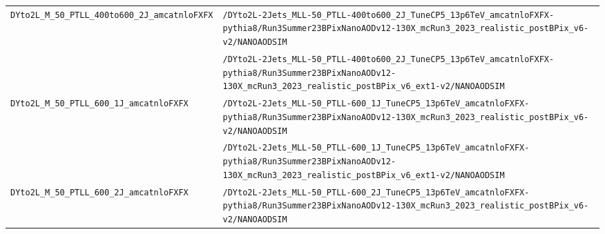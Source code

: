 \begin{longtable}{@{}>{\RaggedRight\arraybackslash}p{} >{\RaggedRight\arraybackslash}p{}@{}}
\addlinespace[2pt]
\texttt{DYto2L\_\allowbreak{}M\_\allowbreak{}50\_\allowbreak{}PTLL\_\allowbreak{}400to600\_\allowbreak{}2J\_\allowbreak{}amcatnloFXFX} & \texttt{/\allowbreak{}DYto2L-\allowbreak{}2Jets\_\allowbreak{}MLL-\allowbreak{}50\_\allowbreak{}PTLL-\allowbreak{}400to600\_\allowbreak{}2J\_\allowbreak{}TuneCP5\_\allowbreak{}13p6TeV\_\allowbreak{}amcatnloFXFX-\allowbreak{}pythia8/\allowbreak{}Run3Summer23BPixNanoAODv12-\allowbreak{}130X\_\allowbreak{}mcRun3\_\allowbreak{}2023\_\allowbreak{}realistic\_\allowbreak{}postBPix\_\allowbreak{}v6-\allowbreak{}v2/\allowbreak{}NANOAODSIM} \\
 & \texttt{/\allowbreak{}DYto2L-\allowbreak{}2Jets\_\allowbreak{}MLL-\allowbreak{}50\_\allowbreak{}PTLL-\allowbreak{}400to600\_\allowbreak{}2J\_\allowbreak{}TuneCP5\_\allowbreak{}13p6TeV\_\allowbreak{}amcatnloFXFX-\allowbreak{}pythia8/\allowbreak{}Run3Summer23BPixNanoAODv12-\allowbreak{}130X\_\allowbreak{}mcRun3\_\allowbreak{}2023\_\allowbreak{}realistic\_\allowbreak{}postBPix\_\allowbreak{}v6\_\allowbreak{}ext1-\allowbreak{}v2/\allowbreak{}NANOAODSIM} \\
\addlinespace[2pt]
\texttt{DYto2L\_\allowbreak{}M\_\allowbreak{}50\_\allowbreak{}PTLL\_\allowbreak{}600\_\allowbreak{}1J\_\allowbreak{}amcatnloFXFX} & \texttt{/\allowbreak{}DYto2L-\allowbreak{}2Jets\_\allowbreak{}MLL-\allowbreak{}50\_\allowbreak{}PTLL-\allowbreak{}600\_\allowbreak{}1J\_\allowbreak{}TuneCP5\_\allowbreak{}13p6TeV\_\allowbreak{}amcatnloFXFX-\allowbreak{}pythia8/\allowbreak{}Run3Summer23BPixNanoAODv12-\allowbreak{}130X\_\allowbreak{}mcRun3\_\allowbreak{}2023\_\allowbreak{}realistic\_\allowbreak{}postBPix\_\allowbreak{}v6-\allowbreak{}v2/\allowbreak{}NANOAODSIM} \\
 & \texttt{/\allowbreak{}DYto2L-\allowbreak{}2Jets\_\allowbreak{}MLL-\allowbreak{}50\_\allowbreak{}PTLL-\allowbreak{}600\_\allowbreak{}1J\_\allowbreak{}TuneCP5\_\allowbreak{}13p6TeV\_\allowbreak{}amcatnloFXFX-\allowbreak{}pythia8/\allowbreak{}Run3Summer23BPixNanoAODv12-\allowbreak{}130X\_\allowbreak{}mcRun3\_\allowbreak{}2023\_\allowbreak{}realistic\_\allowbreak{}postBPix\_\allowbreak{}v6\_\allowbreak{}ext1-\allowbreak{}v2/\allowbreak{}NANOAODSIM} \\
\addlinespace[2pt]
\texttt{DYto2L\_\allowbreak{}M\_\allowbreak{}50\_\allowbreak{}PTLL\_\allowbreak{}600\_\allowbreak{}2J\_\allowbreak{}amcatnloFXFX} & \texttt{/\allowbreak{}DYto2L-\allowbreak{}2Jets\_\allowbreak{}MLL-\allowbreak{}50\_\allowbreak{}PTLL-\allowbreak{}600\_\allowbreak{}2J\_\allowbreak{}TuneCP5\_\allowbreak{}13p6TeV\_\allowbreak{}amcatnloFXFX-\allowbreak{}pythia8/\allowbreak{}Run3Summer23BPixNanoAODv12-\allowbreak{}130X\_\allowbreak{}mcRun3\_\allowbreak{}2023\_\allowbreak{}realistic\_\allowbreak{}postBPix\_\allowbreak{}v6-\allowbreak{}v2/\allowbreak{}NANOAODSIM} \\

\end{longtable}
